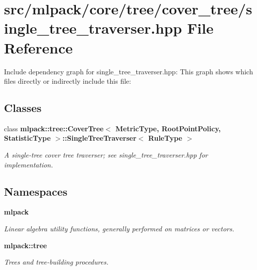 \section{src/mlpack/core/tree/cover\-\_\-tree/single\-\_\-tree\-\_\-traverser.hpp File Reference}
\label{cover__tree_2single__tree__traverser_8hpp}
Include dependency graph for single\-\_\-tree\-\_\-traverser.\-hpp\-:
This graph shows which files directly or indirectly include this file\-:
\subsection*{Classes}
\begin{DoxyCompactItemize}
\item 
class {\bf mlpack\-::tree\-::\-Cover\-Tree$<$ Metric\-Type, Root\-Point\-Policy, Statistic\-Type $>$\-::\-Single\-Tree\-Traverser$<$ Rule\-Type $>$}
\begin{DoxyCompactList}\small\item\em A single-\/tree cover tree traverser; see single\-\_\-tree\-\_\-traverser.\-hpp for implementation. \end{DoxyCompactList}\end{DoxyCompactItemize}
\subsection*{Namespaces}
\begin{DoxyCompactItemize}
\item 
{\bf mlpack}
\begin{DoxyCompactList}\small\item\em Linear algebra utility functions, generally performed on matrices or vectors. \end{DoxyCompactList}\item 
{\bf mlpack\-::tree}
\begin{DoxyCompactList}\small\item\em Trees and tree-\/building procedures. \end{DoxyCompactList}\end{DoxyCompactItemize}
